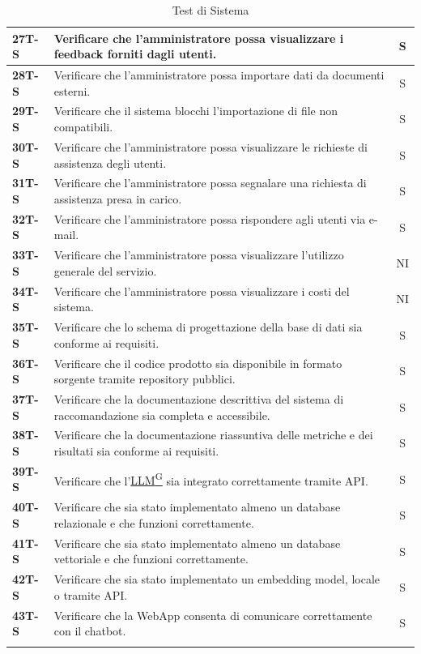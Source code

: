 \documentclass{article}
\begin{document}
\begin{longtable}{|>{\centering\arraybackslash}m{}|>{\raggedright\arraybackslash}m{}|c|}
    \hline
    \textbf{27T-S} & Verificare che l’amministratore possa visualizzare i feedback forniti dagli utenti. & S \\
    \hline
    \textbf{28T-S} & Verificare che l’amministratore possa importare dati da documenti esterni. & S \\
    \hline
    \textbf{29T-S} & Verificare che il sistema blocchi l’importazione di file non compatibili. & S \\
    \hline
    \textbf{30T-S} & Verificare che l’amministratore possa visualizzare le richieste di assistenza degli utenti. & S \\
    \hline
    \textbf{31T-S} & Verificare che l’amministratore possa segnalare una richiesta di assistenza presa in carico. & S \\
    \hline
    \textbf{32T-S} & Verificare che l’amministratore possa rispondere agli utenti via e-mail. & S \\
    \hline
    \textbf{33T-S} & Verificare che l’amministratore possa visualizzare l’utilizzo generale del servizio. & NI \\
    \hline
    \textbf{34T-S} & Verificare che l’amministratore possa visualizzare i costi del sistema. & NI \\
    \hline
    \textbf{35T-S} & Verificare che lo schema di progettazione della base di dati sia conforme ai requisiti. & S \\
    \hline
    \textbf{36T-S} & Verificare che il codice prodotto sia disponibile in formato sorgente tramite repository pubblici. & S \\
    \hline
    \textbf{37T-S} & Verificare che la documentazione descrittiva del sistema di raccomandazione sia completa e accessibile. & S \\
    \hline
    \textbf{38T-S} & Verificare che la documentazione riassuntiva delle metriche e dei risultati sia conforme ai requisiti. & S \\
    \hline
    \textbf{39T-S} & Verificare che l’\href{https://code7crusaders.github.io/docs/PB/documentazione_interna/glossario.html#llm-large-language-model}{LLM\textsuperscript{G}} sia integrato correttamente tramite API. & S \\
    \hline
    \textbf{40T-S} & Verificare che sia stato implementato almeno un database relazionale e che funzioni correttamente. & S \\
    \hline
    \textbf{41T-S} & Verificare che sia stato implementato almeno un database vettoriale e che funzioni correttamente. & S \\
    \hline
    \textbf{42T-S} & Verificare che sia stato implementato un embedding model, locale o tramite API. & S \\
    \hline
    \textbf{43T-S} & Verificare che la WebApp consenta di comunicare correttamente con il chatbot. & S \\
    \hline
\caption{Test di Sistema}
\end{longtable}
\end{document}
